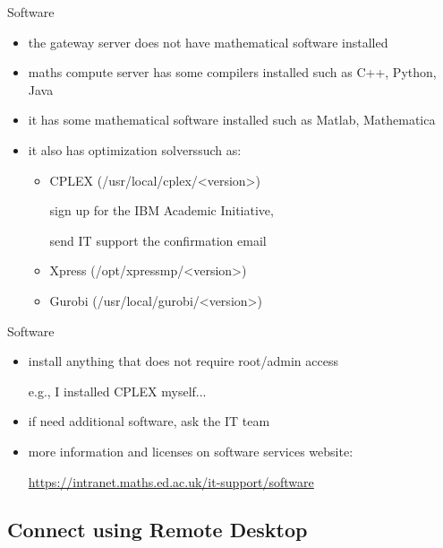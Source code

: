 \documentclass[10pt]{beamer}
\begin{document}
\begin{frame}[fragile]{Software}

\begin{itemize}
    \item the gateway server does not have mathematical software installed
    \item maths compute server has some compilers installed such as C++, Python, Java 
    \item it has some mathematical software installed such as Matlab, Mathematica
    \item it also has optimization solvers\footnotemark such as: 
        \begin{itemize}
            \item {CPLEX (/usr/local/cplex/<version>)
            
            sign up for the IBM Academic Initiative, 
            
            send IT support the confirmation email}
            \item Xpress (/opt/xpressmp/<version>)
            \item Gurobi (/usr/local/gurobi/<version>)
        \end{itemize}
\end{itemize}


\end{frame}

\begin{frame}[fragile]{Software}

\begin{itemize}
    \item {install anything that does not require root/admin access
    
    e.g., I installed CPLEX myself... }
    \item if need additional software, ask the IT team
    \item {more information and licenses on software services website: 

    \underline{https://intranet.maths.ed.ac.uk/it-support/software}}
\end{itemize}

\end{frame}

\subsection{Connect using Remote Desktop}
\end{document}
